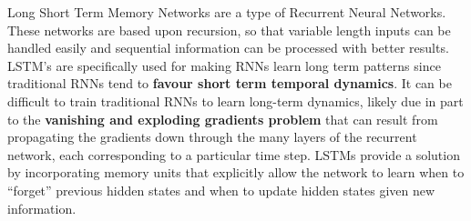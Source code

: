 \documentclass[11pt]{article}
\begin{document}
				Long Short Term Memory Networks are a type of Recurrent Neural Networks. These networks are based upon recursion, so that variable length inputs can be handled easily and sequential information can be processed with better results. LSTM's are specifically used for making RNNs learn long term patterns since traditional RNNs tend to \textbf{favour short term temporal dynamics}. It can be difficult to train traditional RNNs to learn long-term dynamics, likely due in part to the \textbf{vanishing and exploding gradients problem} that can result from propagating the gradients down through the many layers of the recurrent network, each corresponding to a particular time step\cite{ltms}. LSTMs provide a solution by incorporating memory units that explicitly allow the network to learn when to ``forget'' previous hidden states and when to update hidden states given new information\cite{lstmexecute}.\\
		
\end{document}
